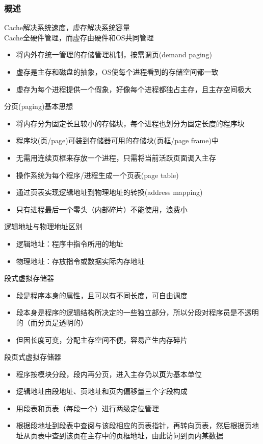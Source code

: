 \subsubsection{概述}
Cache解决系统速度，虚存解决系统容量\\
Cache全硬件管理，而虚存由硬件和OS共同管理
\begin{itemize}
	\item 将内外存统一管理的存储管理机制，按需调页(demand paging)
	\item 虚存是主存和磁盘的抽象，OS使每个进程看到的存储空间都一致
	\item 虚存为每个进程提供一个假象，好像每个进程都独占主存，且主存空间极大
\end{itemize}
\par 分页(paging)基本思想
\begin{itemize}
	\item 将内存分为固定长且较小的存储块，每个进程也划分为固定长度的程序块
	\item 程序块(页/page)可装到存储器可用的存储块(页框/page frame)中
	\item 无需用连续页框来存放一个进程，只需将当前活跃页面调入主存
	\item 操作系统为每个程序/进程生成一个页表(page table)
	\item 通过页表实现逻辑地址到物理地址的转换(address mapping)
	\item 只有进程最后一个零头（内部碎片）不能使用，浪费小
\end{itemize}
逻辑地址与物理地址区别
\begin{itemize}
	\item 逻辑地址：程序中指令所用的地址
	\item 物理地址：存放指令或数据实际内存地址
\end{itemize}
段式虚拟存储器
\begin{itemize}
	\item 段是程序本身的属性，且可以有不同长度，可自由调度
	\item 段本身是程序的逻辑结构所决定的一些独立部分，所以分段对程序员是不透明的（而分页是透明的）
	\item 但因长度可变，分配主存空间不便，容易产生内存碎片
\end{itemize}
段页式虚拟存储器
\begin{itemize}
	\item 程序按模块分段，段内再分页，进入主存仍以\textbf{页}为基本单位
	\item 逻辑地址由段地址、页地址和页内偏移量三个字段构成
	\item 用段表和页表（每段一个）进行两级定位管理
	\item 根据段地址到段表中查阅与该段相应的页表指针，再转向页表，然后根据页地址从页表中查到该页在主存中的页框地址，由此访问到页内某数据
\end{itemize}

